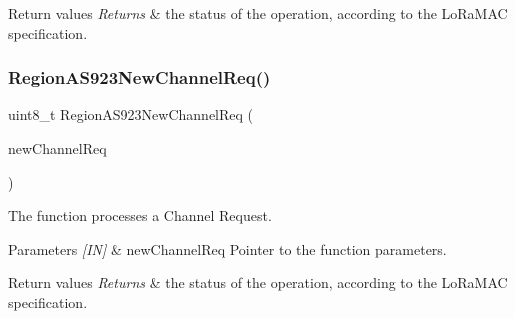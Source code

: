 \begin{DoxyRetVals}{Return values}
{\em Returns} & the status of the operation, according to the Lo\+Ra\+M\+AC specification. \\
\hline
\end{DoxyRetVals}
\mbox{\label{group__REGIONAS923_gaad10b4ed09a71cdff0e385729e4dc345}} 
\subsubsection{\texorpdfstring{Region\+A\+S923\+New\+Channel\+Req()}{RegionAS923NewChannelReq()}}
{\footnotesize\ttfamily uint8\+\_\+t Region\+A\+S923\+New\+Channel\+Req (\begin{DoxyParamCaption}\item[{\hyperlink{group__REGION_gae2abcdb6dbb843c9faf5fd3009eca9d6}{New\+Channel\+Req\+Params\+\_\+t} $\ast$}]{new\+Channel\+Req }\end{DoxyParamCaption})}



The function processes a Channel Request. 


\begin{DoxyParams}{Parameters}
{\em \mbox{[}\+I\+N\mbox{]}} & new\+Channel\+Req Pointer to the function parameters.\\
\hline
\end{DoxyParams}

\begin{DoxyRetVals}{Return values}
{\em Returns} & the status of the operation, according to the Lo\+Ra\+M\+AC specification. \\
\hline
\end{DoxyRetVals}
\mbox{\label{group__REGIONAS923_ga5712c1f33958544c25351d4e5ed2015a}} 
